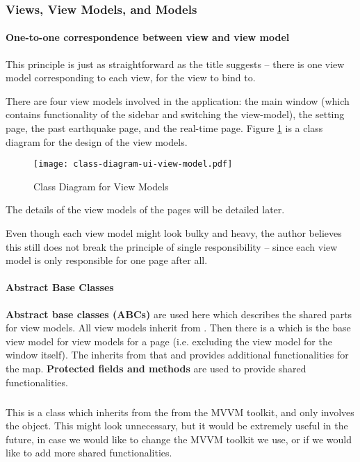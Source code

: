 \subsubsection{Views, View Models, and Models}

\paragraph{One-to-one correspondence between view and view model}

This principle is just as straightforward as the title suggests -- there is one view model corresponding to each view, for the view to bind to.

There are four view models involved in the application: the main window (which contains functionality of the sidebar and switching the view-model), the setting page, the past earthquake page, and the real-time page. Figure \ref{fig:class-diagram-ui-view-models} is a class diagram for the design of the view models.

\begin{figure}
    \centering
    \texttt{[image: class-diagram-ui-view-model.pdf]}
    \caption{Class Diagram for View Models}
    \label{fig:class-diagram-ui-view-models}
\end{figure}

The details of the view models of the pages will be detailed later.

Even though each view model might look bulky and heavy, the author believes this still does not break the principle of single responsibility -- since each view model is only responsible for one page after all.

\paragraph{Abstract Base Classes}

\textbf{Abstract base classes (ABCs)} are used here which describes the shared parts for view models. All view models inherit from . Then there is a  which is the base view model for view models for a page (i.e. excluding the view model for the window itself). The  inherits from that and provides additional functionalities for the map. \textbf{Protected fields and methods} are used to provide shared functionalities.

\subparagraph{}

This is a class which inherits from the  from the MVVM toolkit, and only involves the  object. This might look unnecessary, but it would be extremely useful in the future, in case we would like to change the MVVM toolkit we use, or if we would like to add more shared functionalities.

